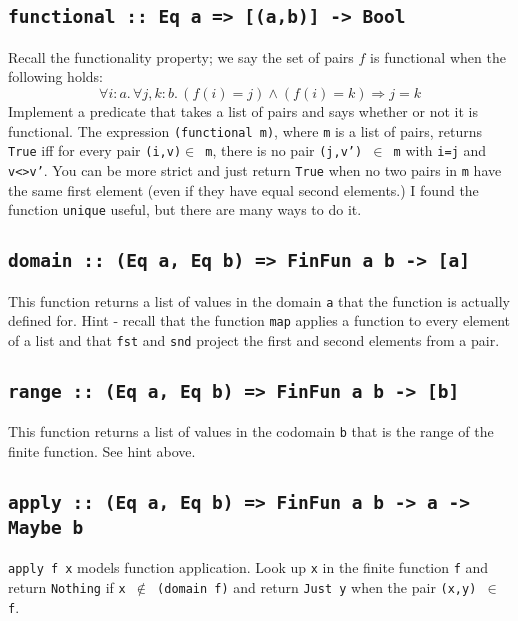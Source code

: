 \documentclass[11pt]{article}
\begin{document}
\subsection{\tt{{functional :: Eq a => [(a,b)] -> Bool}}}
Recall the functionality property; we say the set of pairs $f$ is functional
when the following holds:
\[\forall{}i:a.\, \forall{}j,k:b.\, (f(i) = j) \wedge (f(i) = k) \Rightarrow j = k \]
Implement a predicate that takes a list of pairs and says whether or not it is
functional.  The expression {\tt{(functional m)}}, where {\tt{m}} is a list of
pairs, returns {\tt{True}} iff for every pair {\tt{(i,v)$\in$ m}}, there is no
pair {\tt{(j,v') $\in$ m}} with {\tt{i=j}} and {\tt{v<>v'}}.  You can be more
strict and just return {\tt{True}} when no two pairs in {\tt{m}} have the same
first element (even if they have equal second elements.)  I found the function
{\tt{unique}} useful, but there are many ways to do it.


\subsection{\tt{{domain :: (Eq a, Eq b) => FinFun a b -> [a]}}}
This function returns a list of values in the domain {\tt{a}} that the function
is actually defined for.  Hint - recall that the function {\tt{map}} applies a
function to every element of a list and that {\tt{fst}} and {\tt{snd}} project
the first and second elements from a pair.

\subsection{\tt{range :: (Eq a, Eq b) => FinFun a b -> [b]}}
This function returns a list of values in the codomain {\tt{b}} that is the
range of the finite function. See hint above.

\subsection{\tt{{apply :: (Eq a, Eq b) => FinFun a b -> a -> Maybe b}}}
{\tt{apply f x}} models function application. Look up {\tt{x}} in the finite
function {\tt{f}} and return {\tt{Nothing}} if {\tt{x $\not\in$ (domain f)}}
and return {\tt{Just y}} when the pair {\tt{(x,y) $\in$ f}}.  



\end{document}
